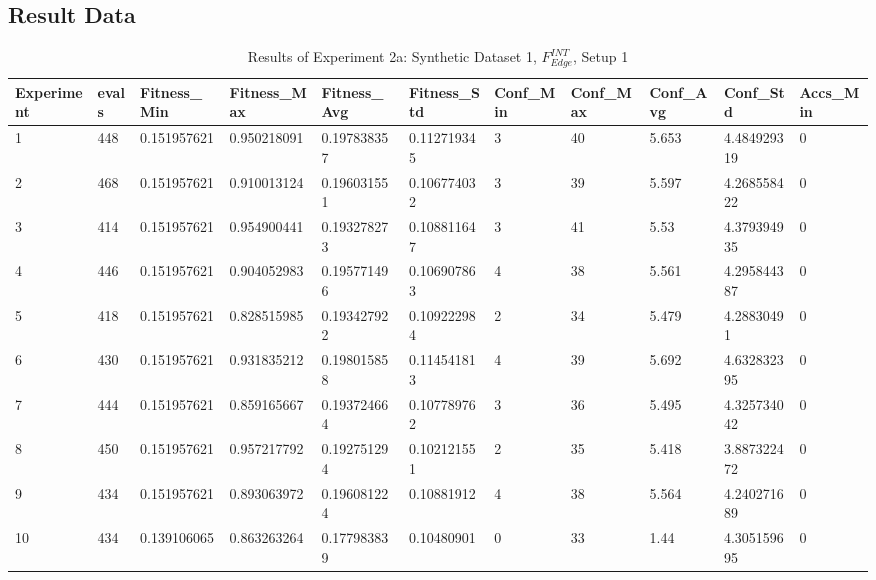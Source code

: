 	\subsection{Result Data}
	\label{sec:A_Exp2b_Data}
		\begin{table}[H]
			\caption{Results of Experiment 2a: Synthetic Dataset 1, $F_{Edge}^{INT}$, Setup 1}
			\label{tab:A_Exp2b_Data}
			\begin{adjustbox}{max width=380pt,keepaspectratio,angle=90}
				\begin{tabular}{|l|l|l|l|l|l|l|l|l|l|l|}
					\rowcolor[HTML]{EFEFEF} 
					\hline
					Experiment & evals & Fitness\_Min & Fitness\_Max & Fitness\_Avg & Fitness\_Std & Conf\_Min & Conf\_Max & Conf\_Avg & Conf\_Std   & Accs\_Min \\ \hline
					1          & 448   & 0.151957621  & 0.950218091  & 0.197838357  & 0.112719345  & 3         & 40        & 5.653     & 4.484929319 & 0         \\ \hline
					2          & 468   & 0.151957621  & 0.910013124  & 0.196031551  & 0.106774032  & 3         & 39        & 5.597     & 4.268558422 & 0         \\ \hline
					3          & 414   & 0.151957621  & 0.954900441  & 0.193278273  & 0.108811647  & 3         & 41        & 5.53      & 4.379394935 & 0         \\ \hline
					4          & 446   & 0.151957621  & 0.904052983  & 0.195771496  & 0.106907863  & 4         & 38        & 5.561     & 4.295844387 & 0         \\ \hline
					5          & 418   & 0.151957621  & 0.828515985  & 0.193427922  & 0.109222984  & 2         & 34        & 5.479     & 4.28830491  & 0         \\ \hline
					6          & 430   & 0.151957621  & 0.931835212  & 0.198015858  & 0.114541813  & 4         & 39        & 5.692     & 4.632832395 & 0         \\ \hline
					7          & 444   & 0.151957621  & 0.859165667  & 0.193724664  & 0.107789762  & 3         & 36        & 5.495     & 4.325734042 & 0         \\ \hline
					8          & 450   & 0.151957621  & 0.957217792  & 0.192751294  & 0.102121551  & 2         & 35        & 5.418     & 3.887322472 & 0         \\ \hline
					9          & 434   & 0.151957621  & 0.893063972  & 0.196081224  & 0.10881912   & 4         & 38        & 5.564     & 4.240271689 & 0         \\ \hline
					10         & 434   & 0.139106065  & 0.863263264  & 0.177983839  & 0.10480901   & 0         & 33        & 1.44      & 4.305159695 & 0         \\ \hline\hline

\end{tabular}
\end{adjustbox}
\end{table}
